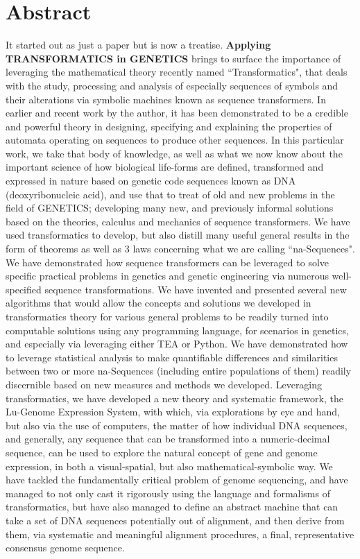 \documentclass[a4paper, 18pt]{book} %
\begin{document}

\mainmatter

\chapter*{Abstract}
\large

It started out as just a paper but is now a treatise. \textbf{Applying TRANSFORMATICS in GENETICS} brings to surface the importance of leveraging the mathematical theory recently named ``Transformatics", that deals with the study, processing and analysis of especially sequences of symbols and their alterations via symbolic machines known as sequence transformers. In earlier and recent work by the author, it has been demonstrated to be a credible and powerful theory in designing, specifying and explaining the properties of automata operating on sequences to produce other sequences. In this particular work, we take that body of knowledge, as well as what we now know about the important science of how biological life-forms are defined, transformed and expressed in nature based on genetic code sequences known as DNA (deoxyribonucleic acid), and use that to treat of old and new problems in the field of GENETICS; developing many new, and previously informal solutions based on the theories, calculus and mechanics of sequence transformers. We have used transformatics to develop, but also distill many useful general results in the form of theorems as well as 3 laws concerning what we are calling ``na-Sequences". We have demonstrated how sequence transformers can be leveraged to solve specific practical problems in genetics and genetic engineering via numerous well-specified sequence transformations. We have invented and presented several new algorithms that would allow the concepts and solutions we developed in transformatics theory for various general problems to be readily turned into computable solutions using any programming language, for scenarios in genetics, and especially via leveraging either TEA or Python. We have demonstrated how to leverage statistical analysis to make quantifiable differences and similarities between two or more na-Sequences (including entire populations of them) readily discernible based on new measures and methods we developed. Leveraging transformatics, we have developed a new theory and systematic framework, the Lu-Genome Expression System, with which, via explorations by eye and hand, but also via the use of computers, the matter of how individual DNA sequences, and generally, any sequence that can be transformed into a numeric-decimal sequence, can be used to explore the natural concept of gene and genome expression, in both a visual-spatial, but also mathematical-symbolic way. We have tackled the fundamentally critical problem of genome sequencing, and have managed to not only cast it rigorously using the language and formalisms of transformatics, but have also managed to define an abstract machine that can take a set of DNA sequences potentially out of alignment, and then derive from them, via systematic and meaningful alignment procedures, a final, representative consensus genome sequence. 
\end{document}
